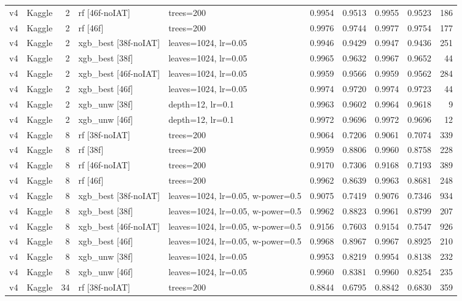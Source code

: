 {\begin{longtable}{llrp{3.2cm}p{4.4cm}rrrrr}
v4 & Kaggle & 2 & rf [46f-noIAT] & trees=200 & 0.9954 & 0.9513 & 0.9955 & 0.9523 & 186 \\
v4 & Kaggle & 2 & rf [46f] & trees=200 & 0.9976 & 0.9744 & 0.9977 & 0.9754 & 177 \\
v4 & Kaggle & 2 & xgb\_best [38f-noIAT] & leaves=1024, lr=0.05 & 0.9946 & 0.9429 & 0.9947 & 0.9436 & 251 \\
v4 & Kaggle & 2 & xgb\_best [38f] & leaves=1024, lr=0.05 & 0.9965 & 0.9632 & 0.9967 & 0.9652 & 44 \\
v4 & Kaggle & 2 & xgb\_best [46f-noIAT] & leaves=1024, lr=0.05 & 0.9959 & 0.9566 & 0.9959 & 0.9562 & 284 \\
v4 & Kaggle & 2 & xgb\_best [46f] & leaves=1024, lr=0.05 & 0.9974 & 0.9720 & 0.9974 & 0.9723 & 44 \\
v4 & Kaggle & 2 & xgb\_unw [38f] & depth=12, lr=0.1 & 0.9963 & 0.9602 & 0.9964 & 0.9618 & 9 \\
v4 & Kaggle & 2 & xgb\_unw [46f] & depth=12, lr=0.1 & 0.9972 & 0.9696 & 0.9972 & 0.9696 & 12 \\
v4 & Kaggle & 8 & rf [38f-noIAT] & trees=200 & 0.9064 & 0.7206 & 0.9061 & 0.7074 & 339 \\
v4 & Kaggle & 8 & rf [38f] & trees=200 & 0.9959 & 0.8806 & 0.9960 & 0.8758 & 228 \\
v4 & Kaggle & 8 & rf [46f-noIAT] & trees=200 & 0.9170 & 0.7306 & 0.9168 & 0.7193 & 389 \\
v4 & Kaggle & 8 & rf [46f] & trees=200 & 0.9962 & 0.8639 & 0.9963 & 0.8681 & 248 \\
v4 & Kaggle & 8 & xgb\_best [38f-noIAT] & leaves=1024, lr=0.05, w-power=0.5 & 0.9075 & 0.7419 & 0.9076 & 0.7346 & 934 \\
v4 & Kaggle & 8 & xgb\_best [38f] & leaves=1024, lr=0.05, w-power=0.5 & 0.9962 & 0.8823 & 0.9961 & 0.8799 & 207 \\
v4 & Kaggle & 8 & xgb\_best [46f-noIAT] & leaves=1024, lr=0.05, w-power=0.5 & 0.9156 & 0.7603 & 0.9154 & 0.7547 & 926 \\
v4 & Kaggle & 8 & xgb\_best [46f] & leaves=1024, lr=0.05, w-power=0.5 & 0.9968 & 0.8967 & 0.9967 & 0.8925 & 210 \\
v4 & Kaggle & 8 & xgb\_unw [38f] & leaves=1024, lr=0.05 & 0.9953 & 0.8219 & 0.9954 & 0.8138 & 232 \\
v4 & Kaggle & 8 & xgb\_unw [46f] & leaves=1024, lr=0.05 & 0.9960 & 0.8381 & 0.9960 & 0.8254 & 235 \\
v4 & Kaggle & 34 & rf [38f-noIAT] & trees=200 & 0.8844 & 0.6795 & 0.8842 & 0.6830 & 359 \\

\end{longtable}}
